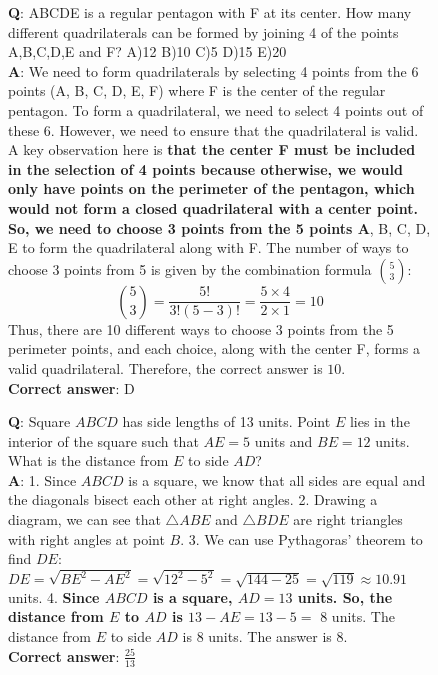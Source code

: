 \begin{figure}[H]
\centering
\begin{tcolorbox}[colback=blue!5!white,colframe=blue!75!black,title=AQUA-RAT example (\qweninstruct)]
\textbf{Q}: ABCDE is a regular pentagon with F at its center. How many different quadrilaterals can be formed by joining 4 of the points A,B,C,D,E and F? A)12 B)10 C)5 D)15 E)20 \\

\textbf{A}: We need to form quadrilaterals by selecting 4 points from the 6 points (A, B, C, D, E, F) where F is the center of the regular pentagon. To form a quadrilateral, we need to select 4 points out of these 6. However, we need to ensure that the quadrilateral is valid. A key observation here is \textbf{that the center F must be included in the selection of 4 points because otherwise, we would only have points on the perimeter of the pentagon, which would not form a closed quadrilateral with a center point. So, we need to choose 3 points from the 5 points A}, B, C, D, E to form the quadrilateral along with F. The number of ways to choose 3 points from 5 is given by the combination formula \( \binom{5}{3} \): \[ \binom{5}{3} = \frac{5!}{3!(5-3)!} = \frac{5 \times 4}{2 \times 1} = 10 \] Thus, there are 10 different ways to choose 3 points from the 5 perimeter points, and each choice, along with the center F, forms a valid quadrilateral. Therefore, the correct answer is \( \boxed{10} \).\\

\textbf{Correct answer}: D
\end{tcolorbox}
\end{figure}

\begin{figure}[H]
\centering
\begin{tcolorbox}[colback=blue!5!white,colframe=blue!75!black,title=MATH example (\phiinstruct)]
\textbf{Q}:  Square $ABCD$ has side lengths of 13 units. Point $E$ lies in the interior of the square such that $AE = 5$ units and $BE = 12$ units. What is the distance from $E$ to side $AD$?\\

\textbf{A}: 1. Since $ABCD$ is a square, we know that all sides are equal and the diagonals bisect each other at right angles. 2. Drawing a diagram, we can see that $\triangle ABE$ and $\triangle BDE$ are right triangles with right angles at point $B$. 3. We can use Pythagoras' theorem to find $DE$: $DE = \sqrt{BE^2 - AE^2} = \sqrt{12^2 - 5^2} = \sqrt{144 - 25} = \sqrt{119} \approx 10.91$ units. 4. \textbf{Since $ABCD$ is a square, $AD = 13$ units. So, the distance from $E$ to $AD$ is $13 - AE = 13 - 5 =$} $8$ units. The distance from $E$ to side $AD$ is 8 units. The answer is $8$.\\

\textbf{Correct answer}: $\frac{25}{13}$
\end{tcolorbox}
\end{figure}



